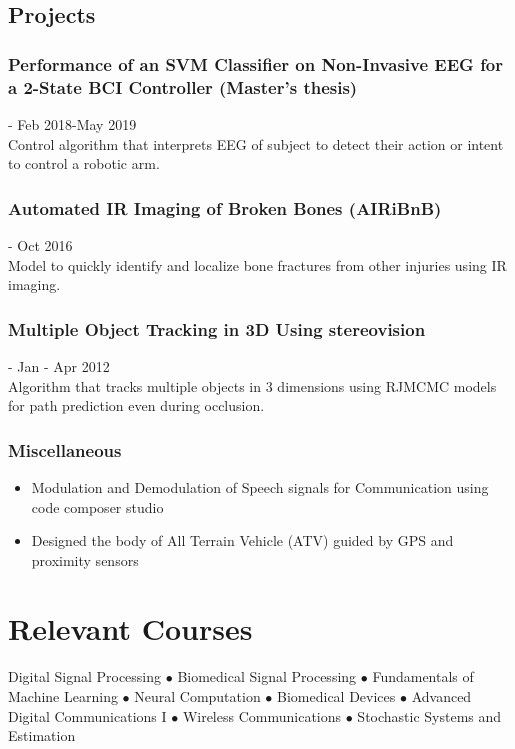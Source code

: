\documentclass{article}
\begin{document}
\subsection{Projects}
\subsubsection{Performance of an SVM Classifier on Non-Invasive EEG for a 2-State BCI Controller (Master's thesis)} \hfill - Feb 2018-May 2019\\
Control algorithm that interprets EEG of subject to detect their action or intent to control a robotic arm.\\


 \subsubsection{Automated IR Imaging of Broken Bones (AIRiBnB)} \hfill - Oct 2016\\
Model to quickly identify and localize bone fractures from other injuries using IR imaging.\\


\subsubsection{Multiple Object Tracking in 3D Using stereovision} \hfill - Jan - Apr 2012\\
Algorithm that tracks multiple objects in 3 dimensions using RJMCMC models for path prediction even during occlusion.\\

   
\subsubsection{Miscellaneous}
\begin{itemize}
    \item Modulation and Demodulation of Speech signals for Communication using code composer studio 
    \item Designed the body of All Terrain Vehicle (ATV) guided by GPS and proximity sensors  
\end{itemize}


\section{Relevant Courses}
Digital Signal Processing $\bullet$ Biomedical Signal Processing $\bullet$ Fundamentals of Machine Learning $\bullet$ Neural Computation $\bullet$ Biomedical Devices $\bullet$ Advanced Digital Communications I $\bullet$ Wireless Communications $\bullet$ Stochastic Systems and Estimation
\end{document}
